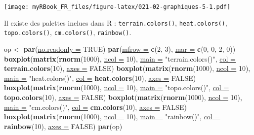 \documentclass[twoside,symmetric]{book}
\newenvironment{Shaded}{}{}
\newcommand{\DataTypeTok}[1]{\underline{#1}}
\newcommand{\DecValTok}[1]{#1}
\newcommand{\KeywordTok}[1]{\textbf{#1}}
\newcommand{\NormalTok}[1]{#1}
\newcommand{\OtherTok}[1]{#1}
\newcommand{\StringTok}[1]{#1}
\begin{document}
\texttt{[image: myRBook\_FR\_files/figure-latex/021-02-graphiques-5-1.pdf]}

Il existe des palettes inclues dans R : \texttt{terrain.colors()}, \texttt{heat.colors()}, \texttt{topo.colors()},
\texttt{cm.colors()}, \texttt{rainbow()}.

\begin{Shaded}
\begin{Highlighting}[]
\NormalTok{op <-}\StringTok{ }\KeywordTok{par}\NormalTok{(}\DataTypeTok{no.readonly =} \OtherTok{TRUE}\NormalTok{)}
\KeywordTok{par}\NormalTok{(}\DataTypeTok{mfrow =} \KeywordTok{c}\NormalTok{(}\DecValTok{2}\NormalTok{, }\DecValTok{3}\NormalTok{), }\DataTypeTok{mar =} \KeywordTok{c}\NormalTok{(}\DecValTok{0}\NormalTok{, }\DecValTok{0}\NormalTok{, }\DecValTok{2}\NormalTok{, }\DecValTok{0}\NormalTok{))}
\KeywordTok{boxplot}\NormalTok{(}\KeywordTok{matrix}\NormalTok{(}\KeywordTok{rnorm}\NormalTok{(}\DecValTok{1000}\NormalTok{), }\DataTypeTok{ncol =} \DecValTok{10}\NormalTok{), }\DataTypeTok{main =} \StringTok{"terrain.colors()"}\NormalTok{, }
  \DataTypeTok{col =} \KeywordTok{terrain.colors}\NormalTok{(}\DecValTok{10}\NormalTok{), }\DataTypeTok{axes =} \OtherTok{FALSE}\NormalTok{)}
\KeywordTok{boxplot}\NormalTok{(}\KeywordTok{matrix}\NormalTok{(}\KeywordTok{rnorm}\NormalTok{(}\DecValTok{1000}\NormalTok{), }\DataTypeTok{ncol =} \DecValTok{10}\NormalTok{), }\DataTypeTok{main =} \StringTok{"heat.colors()"}\NormalTok{, }
  \DataTypeTok{col =} \KeywordTok{heat.colors}\NormalTok{(}\DecValTok{10}\NormalTok{), }\DataTypeTok{axes =} \OtherTok{FALSE}\NormalTok{)}
\KeywordTok{boxplot}\NormalTok{(}\KeywordTok{matrix}\NormalTok{(}\KeywordTok{rnorm}\NormalTok{(}\DecValTok{1000}\NormalTok{), }\DataTypeTok{ncol =} \DecValTok{10}\NormalTok{), }\DataTypeTok{main =} \StringTok{"topo.colors()"}\NormalTok{, }
  \DataTypeTok{col =} \KeywordTok{topo.colors}\NormalTok{(}\DecValTok{10}\NormalTok{), }\DataTypeTok{axes =} \OtherTok{FALSE}\NormalTok{)}
\KeywordTok{boxplot}\NormalTok{(}\KeywordTok{matrix}\NormalTok{(}\KeywordTok{rnorm}\NormalTok{(}\DecValTok{1000}\NormalTok{), }\DataTypeTok{ncol =} \DecValTok{10}\NormalTok{), }\DataTypeTok{main =} \StringTok{"cm.colors()"}\NormalTok{, }
  \DataTypeTok{col =} \KeywordTok{cm.colors}\NormalTok{(}\DecValTok{10}\NormalTok{), }\DataTypeTok{axes =} \OtherTok{FALSE}\NormalTok{)}
\KeywordTok{boxplot}\NormalTok{(}\KeywordTok{matrix}\NormalTok{(}\KeywordTok{rnorm}\NormalTok{(}\DecValTok{1000}\NormalTok{), }\DataTypeTok{ncol =} \DecValTok{10}\NormalTok{), }\DataTypeTok{main =} \StringTok{"rainbow()"}\NormalTok{, }
  \DataTypeTok{col =} \KeywordTok{rainbow}\NormalTok{(}\DecValTok{10}\NormalTok{), }\DataTypeTok{axes =} \OtherTok{FALSE}\NormalTok{)}
\KeywordTok{par}\NormalTok{(op)}
\end{Highlighting}
\end{Shaded}
\end{document}

